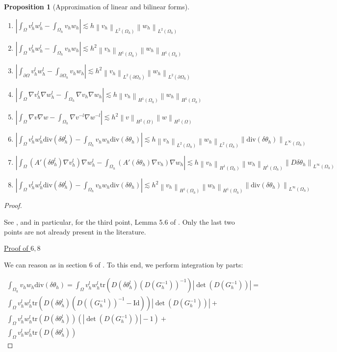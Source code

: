 \documentclass[english,a4paper,9pt,oneside]{scrbook}	%
\theoremstyle{break}
\newtheorem{prop}[equation]{Proposition}
\newenvironment{mproof}[1][\proofname]{%
  \begin{proof}[#1]$ $\par\nobreak\ignorespaces
}{%
  \end{proof}
}
\renewcommand*{\proofname}{Proof}
\theoremstyle{remark}
\newcommand{\ds}{\displaystyle}
\newcommand{\norm}[1]{\left\lVert#1\right\rVert}
\newcommand{\tr}{\text{tr}}
\newcommand{\id}{\text{Id}}
\newcommand{\te}{\theta}
\newcommand{\dive}{\text{div}}
\begin{document}
\begin{appendices}
\begin{prop}[Approximation of linear and bilinear forms]
\begin{enumerate}
	\item $\ds \left | \int_\Omega v_h^lw_h^l - \int_{\Omega_h}v_hw_h\right |\lesssim h \norm{v_h}_{L^2(\Omega_h)}\norm{w_h}_{L^2(\Omega_h)}$
	\item $\ds \left | \int_\Omega v_h^lw_h^l - \int_{\Omega_h}v_hw_h\right |\lesssim h^2 \norm{v_h}_{H^1(\Omega_h)}\norm{w_h}_{H^1(\Omega_h)}$
	\item $\ds \left | \int_{\partial \Omega} v_h^lw_h^l - \int_{\partial \Omega_h}v_hw_h\right |\lesssim h^2 \norm{v_h}_{L^2(\partial \Omega_h)}\norm{w_h}_{L^2(\partial \Omega_h)}$
	\item $\ds \left | \int_\Omega \nabla v_h^l\nabla w_h^l - \int_{\Omega_h}\nabla v_h\nabla w_h\right |\lesssim h \norm{v_h}_{H^1(\Omega_h)}\norm{w_h}_{H^1(\Omega_h)}$
	\item $\ds \left | \int_\Omega \nabla v\nabla w - \int_{\Omega_h}\nabla v^{-l}\nabla w^{-l}\right |\lesssim h^2 \norm{v}_{H^2(\Omega)}\norm{w}_{H^2(\Omega)}$
	\item $\ds \left | \int_\Omega v_h^lw_h^l \dive(\delta  \te_h^l) - \int_{\Omega_h}v_h w_h \dive(\delta \te_h)\right |\lesssim h \norm{v_h}_{L^2(\Omega_h)}\norm{w_h}_{L^2(\Omega_h)} \norm{\dive(\delta \te_h)}_{L^\infty(\Omega_h)}$
	\item $\ds \left | \int_\Omega (A'(\delta	\te_h^l)\nabla v_h^l)\nabla w_h^l - \int_{\Omega_h}(A'(\delta	\te_h)\nabla v_h)\nabla w_h\right |\lesssim h \norm{v_h}_{H^1(\Omega_h)}\norm{w_h}_{H^1(\Omega_h)}\norm{D\delta \te_h}_{L^\infty(\Omega_h)}$
	\item $\ds \left | \int_\Omega v_h^l w_h^l \dive(\delta  \te_h^l) - \int_{\Omega_h}v_h w_h \dive(\delta \te_h)\right |\lesssim h^2 \norm{v_h}_{H^1(\Omega_h)}\norm{w_h}_{H^1(\Omega_h)} \norm{\dive(\delta \te_h)}_{L^\infty(\Omega_h)}$
\end{enumerate}
\end{prop}

\begin{mproof}
See \cite{edelmann}, and in particular, for the third point, Lemma 5.6 of \cite{kovacs}. Only the last two points are not already present in the literature.

\underline{Proof of $6, 8$}

We can reason as in section 6 of \cite{elliott}. To this end, we perform integration by parts:

\begin{align*}
	\int_{\Omega_h}v_h w_h \dive(\delta \te_h) = \int_{\Omega}v_h^l w_h^l \tr(D(\delta \te_h^l)(D(G_h^{-1}))^{-1})|\det(D(G_h^{-1}))|=\\
	\int_{\Omega}v_h^l w_h^l \tr(D(\delta \te_h^l)(D((G_h^{-1}))^{-1} - \id))|\det(D(G_h^{-1}))|+\\
	\int_{\Omega}v_h^l w_h^l \tr(D(\delta \te_h^l))(|\det(D(G_h^{-1}))|-1)+\\
	\int_{\Omega}v_h^l w_h^l \tr(D(\delta \te_h^l))
\end{align*}


\end{mproof}
\end{appendices}
\end{document}
